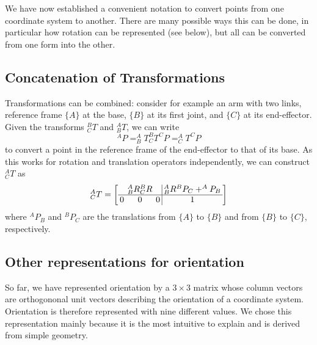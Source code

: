 We have now established a convenient notation to convert points from one coordinate system to another. There are many possible ways this can be done, in particular how rotation can be represented (see below), but all can be converted from one form into the other.

\subsection{Concatenation of Transformations}\label{sec:kinematics:coordsystems:concatenation}

Transformations can be combined: consider for example an arm with two links, reference frame $\{A\}$ at the base, $ \{B\} $ at its first joint, and $\{C\}$ at its end-effector. Given the transforms $ ^B_CT$ and $ ^A_BT$, we can write
\begin{equation}
^AP=^A_BT^B_CT^CP=^A_CT^CP
\end{equation}
to convert a point in the reference frame of the end-effector to that of its base. As this works for rotation and translation operators independently, we can construct $ ^A_CT$ as
\begin{equation}
^A_CT=\left[\arraycolsep=2pt\begin{array}{ccc|c} & ^A_BR^B_CR & & ^A_BR^BP_C +^AP_B \\\hline 0 & 0 & 0 & 1\end{array}\right]
\end{equation}
%
where $ ^AP_B$ and $ ^BP_C$ are the translations from $\{A\}$ to $\{B\}$ and from $ \{B\}$ to $\{C\}$, respectively.

\subsection{Other representations for orientation}

So far, we have represented orientation by a $3\times3$ matrix whose column vectors are orthogononal unit vectors describing the orientation of a coordinate system. Orientation is therefore represented with nine different values. We chose this representation mainly because it is the most intuitive to explain and is derived from simple geometry.


